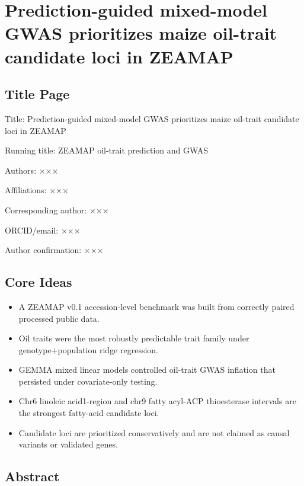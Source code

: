 \documentclass[
]{article}
\author{}
\date{}
\providecommand{\tightlist}{%
  \setlength{\itemsep}{0pt}\setlength{\parskip}{0pt}}
\begin{document}
\section{Prediction-guided mixed-model GWAS prioritizes maize oil-trait
candidate loci in
ZEAMAP}\label{prediction-guided-mixed-model-gwas-prioritizes-maize-oil-trait-candidate-loci-in-zeamap}

\subsection{Title Page}\label{title-page}

Title: Prediction-guided mixed-model GWAS prioritizes maize oil-trait
candidate loci in ZEAMAP

Running title: ZEAMAP oil-trait prediction and GWAS

Authors: ×××

Affiliations: ×××

Corresponding author: ×××

ORCID/email: ×××

Author confirmation: ×××

\subsection{Core Ideas}\label{core-ideas}

\begin{itemize}
\tightlist
\item
  A ZEAMAP v0.1 accession-level benchmark was built from correctly
  paired processed public data.
\item
  Oil traits were the most robustly predictable trait family under
  genotype+population ridge regression.
\item
  GEMMA mixed linear models controlled oil-trait GWAS inflation that
  persisted under covariate-only testing.
\item
  Chr6 linoleic acid1-region and chr9 fatty acyl-ACP thioesterase
  intervals are the strongest fatty-acid candidate loci.
\item
  Candidate loci are prioritized conservatively and are not claimed as
  causal variants or validated genes.
\end{itemize}

\subsection{Abstract}\label{abstract}
\end{document}
